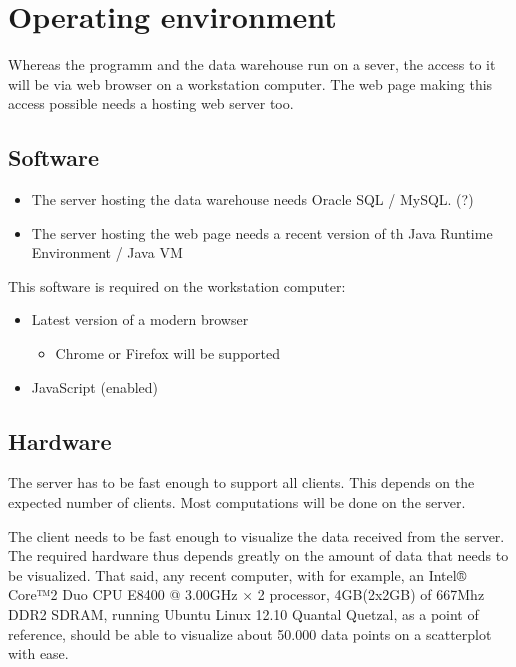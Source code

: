 \section{Operating environment}


Whereas the programm and the data warehouse run on a sever, 
the access to it will be via web browser on a workstation computer. 
The web page making this access possible needs a hosting web server too.


\subsection{Software}
\begin{itemize}
  \item The server hosting the data warehouse needs Oracle SQL / MySQL. (?) %
  
  \item The server hosting the web page needs a 
  recent version of th Java Runtime Environment / Java VM  %
\end{itemize}




This software is required on the workstation computer:
\begin{itemize}
  \item Latest version of a modern browser
  \begin{itemize}
    \item Chrome or Firefox will be supported
  \end{itemize}
  \item JavaScript (enabled)
\end{itemize}


\subsection{Hardware}

The server has to be fast enough to support all clients. This depends on
the expected number of clients. Most computations will be done on the server.

The client needs to be fast enough to visualize the data received from the server. 
The required hardware thus depends greatly on the amount of data that needs to be 
visualized. That said, any recent computer, with for example, 
an Intel® Core™2 Duo CPU E8400 @ 3.00GHz × 2 processor, 
4GB(2x2GB) of 667Mhz DDR2 SDRAM, running Ubuntu Linux 12.10 Quantal Quetzal, 
as a point of reference, should be able to visualize about 50.000 
data points on a scatterplot with ease.


